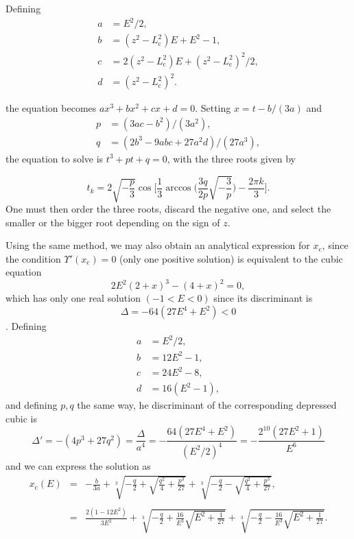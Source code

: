 \documentclass[11pt]{article}
\newcommand{\rc}{\mathrm{c}}
\newcommand{\Lc}{L_{{\mathrm{c}}}}
\newcommand{\xc}{x_{\rc}}
\begin{document}
\begin{appendices}
Defining
\begin{align*}
  a &= E^{2}/2, \\
  b &= (z^{2}-\Lc^{2})E+E^{2}-1 ,\\
  c &= 2(z^{2}-\Lc^{2})E + (z^{2}-\Lc^{2})^{2}/2 ,\\
  d &= (z^{2}-\Lc^{2})^{2} .
\end{align*}

the equation becomes $a x^{3}+b x^{2}+c x+d = 0$. Setting $x=t-b/(3a)$ and
\begin{align*}
  p &= (3ac -b^{2})/(3a^{2}), \\
  q &= (2b^{3}-9abc+27a^{2}d)/(27a^{3}) ,
  \end{align*}
the equation to solve is $t^{3}+pt+q=0$, with the three roots given by

\begin{equation}
  t_{k} = 2\sqrt{-\frac{p}{3}} \cos\bigg[\frac{1}{3}\arccos\bigg(\frac{3q}{2p} \sqrt{-\frac{3}{p}}\bigg)-\frac{2\pi k}{3}\bigg] .
  \label{eq:Viete_formula_varphi(z)}
\end{equation}
One must then order the three roots, discard the negative one, and select the smaller or the bigger root depending on the sign of $z$.

Using the same method, we may also obtain an analytical expression for $\xc$, since the condition $\Upsilon'(\xc)=0$ (only one positive solution) is equivalent to the cubic equation
\begin{equation}
   2E^{2}(2+x)^{3} - (4+x)^{2} = 0 ,
  \label{eq:xcPlummer}
\end{equation}
which has only one real solution $(-1<E<0)$ since its discriminant is $$\Delta=-64(27E^{4}+E^{2})<0$$. Defining
\begin{align*}
  a &= E^{2}/2, \\
  b &= 12E^{2}-1 ,\\
  c &= 24E^{2}-8,\\
  d &= 16(E^{2}-1) ,
\end{align*}
and defining $p,q$ the same way, he discriminant of the corresponding depressed cubic is $$\Delta'=-(4p^{3}+27q^{2})=\frac{\Delta}{a^{4}}=-\frac{64(27E^{4}+E^{2})}{( E^{2}/2)^{4}}=-\frac{2^{10}(27E^{2}+1)}{E^{6}}$$  and we can express the solution as
\begin{equation}
  \begin{array}{ccl}
    \xc(E) &=& \displaystyle{-\frac{b}{3a} + \sqrt[3]{-\frac{q}{2}+\sqrt{\frac{q^{2}}{4}+\frac{p^{3}}{27}}} + \sqrt[3]{-\frac{q}{2}-\sqrt{\frac{q^{2}}{4}+\frac{p^{3}}{27}}}} , \\
    {}&{}&{} \\
    {} &=& \displaystyle{\frac{2(1-12E^{2})}{3E^{2}} + \sqrt[3]{-\frac{q}{2}+\frac{16}{E^{3}}\sqrt{E^{2}+\frac{1}{27}}} + \sqrt[3]{-\frac{q}{2}-\frac{16}{E^{3}}\sqrt{E^{2}+\frac{1}{27}}}} .
    \end{array}
  \label{eq:xcPlummer}
  \end{equation}


\end{appendices}
\end{document}
